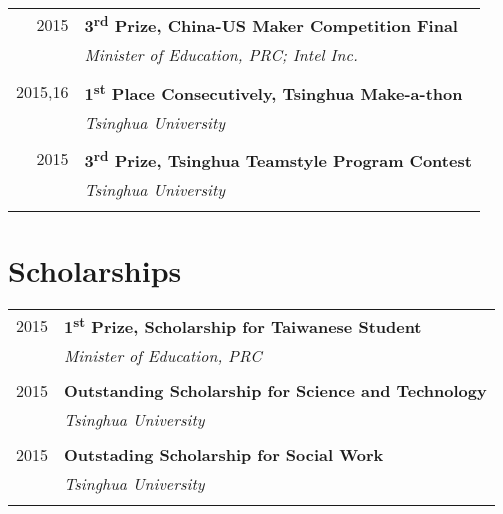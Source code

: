 \documentclass[10pt]{article} %
\begin{document}
{\begin{minipage}[t]{0.5\textwidth}
\begin{tabular}{rl}
2015	 & \textbf{3\textsuperscript{rd} Prize, China-US Maker Competition Final}\\
& \textit{Minister of Education, PRC; Intel Inc.}\\ \\

2015,16	 & \textbf{1\textsuperscript{st} Place Consecutively, Tsinghua Make-a-thon}\\
& \textit{Tsinghua University}\\ \\

2015	 & \textbf{3\textsuperscript{rd} Prize, Tsinghua Teamstyle Program Contest}\\
& \textit{Tsinghua University}\\ \\

\end{tabular}


\section{Scholarships} 

\begin{tabular}{rl}

2015	 & \textbf{1\textsuperscript{st} Prize, Scholarship for Taiwanese Student}\\
& \textit{Minister of Education, PRC}\\ \\

2015	 & \textbf{Outstanding Scholarship for Science and Technology}\\
& \textit{Tsinghua University}\\ \\

2015	 & \textbf{Outstading Scholarship for Social Work}\\
& \textit{Tsinghua University}\\ \\


\end{tabular}
\end{minipage}}
\end{document}

